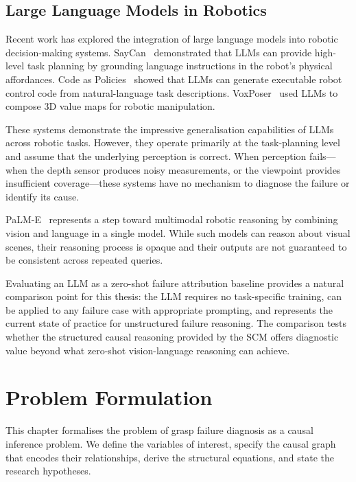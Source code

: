 \documentclass[11pt,a4paper]{report}
\begin{document}
\section{Large Language Models in Robotics}
\label{sec:bg_llm}

Recent work has explored the integration of large language models into robotic decision-making systems. SayCan~\cite{ahn2022saycan} demonstrated that LLMs can provide high-level task planning by grounding language instructions in the robot's physical affordances. Code as Policies~\cite{liang2023code} showed that LLMs can generate executable robot control code from natural-language task descriptions. VoxPoser~\cite{huang2023voxposer} used LLMs to compose 3D value maps for robotic manipulation.

These systems demonstrate the impressive generalisation capabilities of LLMs across robotic tasks. However, they operate primarily at the task-planning level and assume that the underlying perception is correct. When perception fails---when the depth sensor produces noisy measurements, or the viewpoint provides insufficient coverage---these systems have no mechanism to diagnose the failure or identify its cause.

PaLM-E~\cite{driess2023palm} represents a step toward multimodal robotic reasoning by combining vision and language in a single model. While such models can reason about visual scenes, their reasoning process is opaque and their outputs are not guaranteed to be consistent across repeated queries.

Evaluating an LLM as a zero-shot failure attribution baseline provides a natural comparison point for this thesis: the LLM requires no task-specific training, can be applied to any failure case with appropriate prompting, and represents the current state of practice for unstructured failure reasoning. The comparison tests whether the structured causal reasoning provided by the SCM offers diagnostic value beyond what zero-shot vision-language reasoning can achieve.


\chapter{Problem Formulation}
\label{ch:formulation}

This chapter formalises the problem of grasp failure diagnosis as a causal inference problem. We define the variables of interest, specify the causal graph that encodes their relationships, derive the structural equations, and state the research hypotheses.
\end{document}

